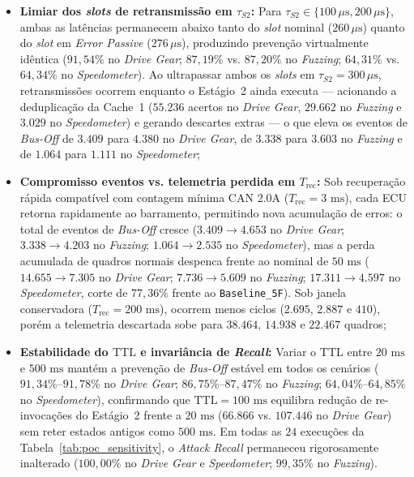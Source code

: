 \documentclass[conference]{IEEEtran}
\begin{document}
\begin{itemize}
    \item \textbf{Limiar dos \textit{slots} de retransmissão em $\tau_{S2}$:} Para $\tau_{S2} \in \{100\,\mu\text{s}, 200\,\mu\text{s}\}$, ambas as latências permanecem abaixo tanto do \textit{slot} nominal ($260\,\mu\text{s}$) quanto do \textit{slot} em \textit{Error Passive} ($276\,\mu\text{s}$), produzindo prevenção virtualmente idêntica ($91{,}54\%$ no \textit{Drive Gear}; $87{,}19\%$ vs. $87{,}20\%$ no \textit{Fuzzing}; $64{,}31\%$ vs. $64{,}34\%$ no \textit{Speedometer}). Ao ultrapassar ambos os \textit{slots} em $\tau_{S2} = 300\,\mu\text{s}$, retransmissões ocorrem enquanto o Estágio~2 ainda executa --- acionando a deduplicação da Cache~1 ($55.236$ acertos no \textit{Drive Gear}, $29.662$ no \textit{Fuzzing} e $3.029$ no \textit{Speedometer}) e gerando descartes extras --- o que eleva os eventos de \textit{Bus-Off} de $3.409$ para $4.380$ no \textit{Drive Gear}, de $3.338$ para $3.603$ no \textit{Fuzzing} e de $1.064$ para $1.111$ no \textit{Speedometer};
    \item \textbf{Compromisso eventos vs. telemetria perdida em $T_{\text{rec}}$:} Sob recuperação rápida compatível com contagem mínima CAN 2.0A ($T_{\text{rec}} = 3\text{ ms}$), cada ECU retorna rapidamente ao barramento, permitindo nova acumulação de erros: o total de eventos de \textit{Bus-Off} cresce ($3.409 \to 4.653$ no \textit{Drive Gear}; $3.338 \to 4.203$ no \textit{Fuzzing}; $1.064 \to 2.535$ no \textit{Speedometer}), mas a perda acumulada de quadros normais despenca frente ao nominal de $50\text{ ms}$ ($14.655 \to 7.305$ no \textit{Drive Gear}; $7.736 \to 5.609$ no \textit{Fuzzing}; $17.311 \to 4.597$ no \textit{Speedometer}, corte de $77{,}36\%$ frente ao \texttt{Baseline\_5F}). Sob janela conservadora ($T_{\text{rec}} = 200\text{ ms}$), ocorrem menos ciclos ($2.695$, $2.887$ e $410$), porém a telemetria descartada sobe para $38.464$, $14.938$ e $22.467$ quadros;
    \item \textbf{Estabilidade do $\text{TTL}$ e invariância de \textit{Recall}:} Variar o $\text{TTL}$ entre $20\text{ ms}$ e $500\text{ ms}$ mantém a prevenção de \textit{Bus-Off} estável em todos os cenários ($91{,}34\%\text{--}91{,}78\%$ no \textit{Drive Gear}; $86{,}75\%\text{--}87{,}47\%$ no \textit{Fuzzing}; $64{,}04\%\text{--}64{,}85\%$ no \textit{Speedometer}), confirmando que $\text{TTL}=100\text{ ms}$ equilibra redução de re-invocações do Estágio~2 frente a $20\text{ ms}$ ($66.866$ vs. $107.446$ no \textit{Drive Gear}) sem reter estados antigos como $500\text{ ms}$. Em todas as $24$ execuções da Tabela~\ref{tab:poc_sensitivity}, o \textit{Attack Recall} permaneceu rigorosamente inalterado ($100{,}00\%$ no \textit{Drive Gear} e \textit{Speedometer}; $99{,}35\%$ no \textit{Fuzzing}).
\end{itemize}
\end{document}
